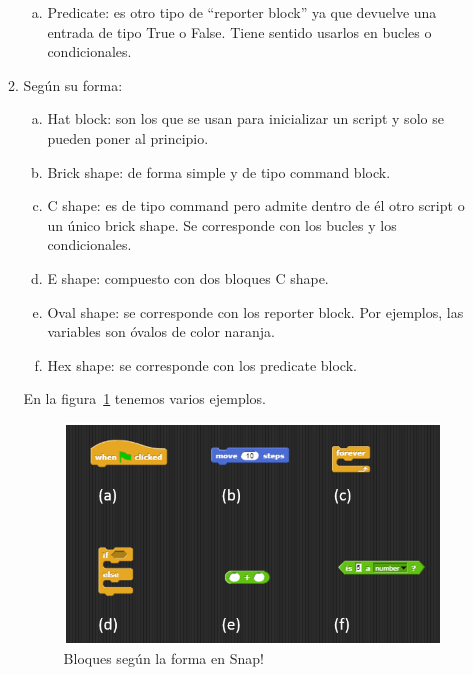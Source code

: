 \documentclass[a4paper, 12pt]{book}
\begin{document}
\begin{itemize}
\begin{enumerate}[1)]
\begin{enumerate}[a)]
             \item Predicate: es otro tipo de ``reporter block'' ya que devuelve una entrada de tipo True o False. Tiene sentido usarlos en bucles o condicionales.
            \end{enumerate}
        \item Según su forma:
             \begin{enumerate}[a)]
             \item Hat block: son los que se usan para inicializar un script y solo se pueden poner al principio.
             \item Brick shape: de forma simple y de tipo command block.
             \item C shape: es de tipo command pero admite dentro de él otro script o un único brick shape. Se corresponde con los bucles y los condicionales.
             \item E shape: compuesto con dos bloques C shape.
             \item Oval shape: se corresponde con los reporter block. Por ejemplos, las variables son óvalos de color naranja.
             \item Hex shape: se corresponde con los predicate block.
             \end{enumerate}
        En la figura~\ref{figura:shape} tenemos varios ejemplos.
        
        \begin{figure}[h]
                        \centering
                        \includegraphics[scale=0.55]{img/shapes.PNG}
                        \caption{Bloques según la forma en Snap!}
                        \label{figura:shape}
        \end{figure}
    \end{enumerate}
    
\end{itemize}
\end{document}
